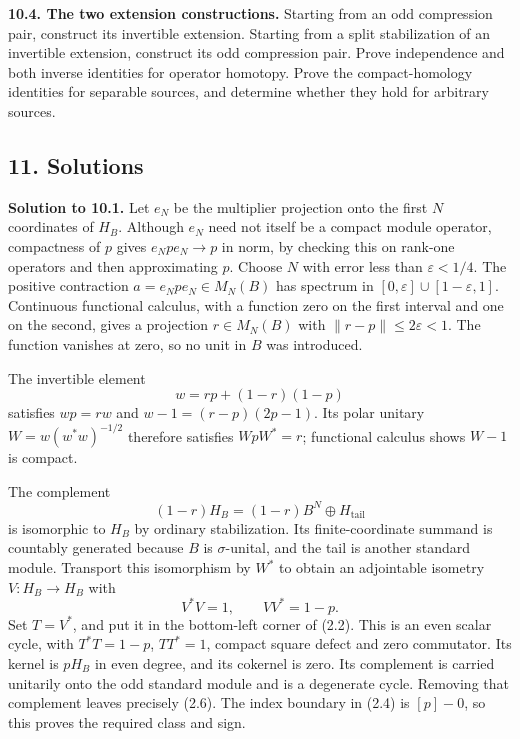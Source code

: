 \documentclass[
  11pt,
]{article}
\begin{document}
\textbf{10.4. The two extension constructions.} Starting from an odd
compression pair, construct its invertible extension. Starting from a
split stabilization of an invertible extension, construct its odd
compression pair. Prove independence and both inverse identities for
operator homotopy. Prove the compact-homology identities for separable
sources, and determine whether they hold for arbitrary sources.

\subsection{11. Solutions}\label{solutions}

\textbf{Solution to 10.1.} Let \(e_N\) be the multiplier projection onto
the first \(N\) coordinates of \(H_B\). Although \(e_N\) need not itself
be a compact module operator, compactness of \(p\) gives
\(e_Npe_N\to p\) in norm, by checking this on rank-one operators and
then approximating \(p\). Choose \(N\) with error less than
\(\varepsilon<1/4\). The positive contraction \(a=e_Npe_N\in M_N(B)\)
has spectrum in \([0,\varepsilon]\cup[1-\varepsilon,1]\). Continuous
functional calculus, with a function zero on the first interval and one
on the second, gives a projection \(r\in M_N(B)\) with
\(\|r-p\|\leq2\varepsilon<1\). The function vanishes at zero, so no unit
in \(B\) was introduced.

The invertible element \[
w=rp+(1-r)(1-p)
\] satisfies \(wp=rw\) and \(w-1=(r-p)(2p-1)\). Its polar unitary
\(W=w(w^*w)^{-1/2}\) therefore satisfies \(WpW^*=r\); functional
calculus shows \(W-1\) is compact.

The complement \[
(1-r)H_B=(1-r)B^N\oplus H_{\mathrm{tail}}
\] is isomorphic to \(H_B\) by ordinary stabilization. Its
finite-coordinate summand is countably generated because \(B\) is
\(\sigma\)-unital, and the tail is another standard module. Transport
this isomorphism by \(W^*\) to obtain an adjointable isometry
\(V:H_B\to H_B\) with \[
V^*V=1,\qquad VV^*=1-p.
\] Set \(T=V^*\), and put it in the bottom-left corner of (2.2). This is
an even scalar cycle, with \(T^*T=1-p\), \(TT^*=1\), compact square
defect and zero commutator. Its kernel is \(pH_B\) in even degree, and
its cokernel is zero. Its complement is carried unitarily onto the odd
standard module and is a degenerate cycle. Removing that complement
leaves precisely (2.6). The index boundary in (2.4) is \([p]-0\), so
this proves the required class and sign.
\end{document}
